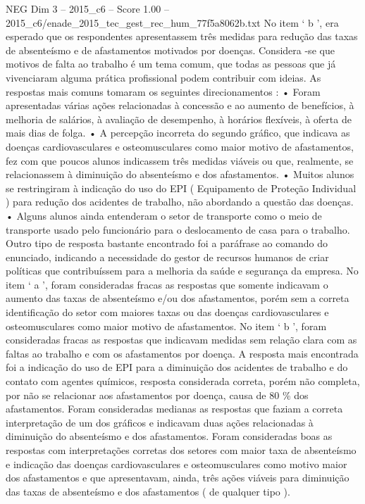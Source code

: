 \begin{textsample}{NEG Dim 3 – 2015\_c6 – Score 1.00 – 2015\_c6/enade\_2015\_tec\_gest\_rec\_hum\_77f5a8062b.txt}
No item ‘ b ’, era esperado que os respondentes apresentassem três medidas para redução das taxas de absenteísmo e de afastamentos motivados por doenças.
Considera -se que motivos de falta ao trabalho é um tema comum, que todas as pessoas que já vivenciaram alguma prática profissional podem contribuir com ideias.
As respostas mais comuns tomaram os seguintes direcionamentos : • Foram apresentadas várias ações relacionadas à concessão e ao aumento de benefícios, à melhoria de salários, à avaliação de desempenho, à horários flexíveis, à oferta de mais dias de folga. • A percepção incorreta do segundo gráfico, que indicava as doenças cardiovasculares e osteomusculares como maior motivo de afastamentos, fez com que poucos alunos indicassem três medidas viáveis ou que, realmente, se relacionassem à diminuição do absenteísmo e dos afastamentos. • Muitos alunos se restringiram à indicação do uso do EPI ( Equipamento de Proteção Individual ) para redução dos acidentes de trabalho, não abordando a questão das doenças. • Alguns alunos ainda entenderam o setor de transporte como o meio de transporte usado pelo funcionário para o deslocamento de casa para o trabalho.  Outro tipo de resposta bastante encontrado foi a paráfrase ao comando do enunciado, indicando a necessidade do gestor de recursos humanos de criar políticas que contribuíssem para a melhoria da saúde e segurança da empresa.
No item ‘ a ’, foram consideradas fracas as respostas que somente indicavam o aumento das taxas de absenteísmo e/ou dos afastamentos, porém sem a correta identificação do setor com maiores taxas ou das doenças cardiovasculares e osteomusculares como maior motivo de afastamentos.
No item ‘ b ’, foram consideradas fracas as respostas que indicavam medidas sem relação clara com as faltas ao trabalho e com os afastamentos por doença.
A resposta mais encontrada foi a indicação do uso de EPI para a diminuição dos acidentes de trabalho e do contato com agentes químicos, resposta considerada correta, porém não completa, por não se relacionar aos afastamentos por doença, causa de 80 \% dos afastamentos.
Foram consideradas medianas as respostas que faziam a correta interpretação de um dos gráficos e indicavam duas ações relacionadas à diminuição do absenteísmo e dos afastamentos.
Foram consideradas boas as respostas com interpretações corretas dos setores com maior taxa de absenteísmo e indicação das doenças cardiovasculares e osteomusculares como motivo maior dos afastamentos e que apresentavam, ainda, três ações viáveis para diminuição das taxas de absenteísmo e dos afastamentos ( de qualquer tipo ).

\end{textsample}
